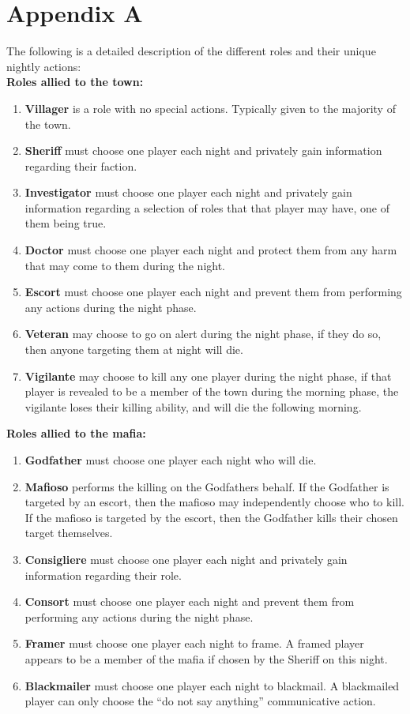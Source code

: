 \section{Appendix A}\label{app:A}
The following is a detailed description of the different roles and their unique nightly actions: \\
\textbf{Roles allied to the town:} 
\begin{enumerate}
	\item\textbf{Villager} is a  role with no special actions. Typically given to the majority of the town. 
	\item\textbf{Sheriff} must choose one player each night and privately gain information regarding their faction. 
	\item\textbf{Investigator} must choose one player each night and privately gain information regarding a selection of roles that that player may have, one of them being true.
	\item\textbf{Doctor} must choose one player each night and protect them from any harm that may come to them during the night. 
	\item\textbf{Escort} must choose one player each night and prevent them from performing any actions during the night phase.
	\item\textbf{Veteran} may choose to go on alert during the night phase, if they do so, then anyone targeting them at night will die. 
	\item\textbf{Vigilante} may choose to kill any one player during the night phase, if that player is revealed to be a member of the town during the morning phase, the vigilante loses their killing ability, and will die the following morning.
\end{enumerate}
\textbf{Roles allied to the mafia:} 
\begin{enumerate}
	\item\textbf{Godfather} must choose one player each night who will die. 
	\item\textbf{Mafioso} performs the killing on the Godfathers behalf. If the Godfather is targeted by an escort, then the mafioso may independently choose who to kill. If the mafioso is targeted by the escort, then the Godfather kills their chosen target themselves.
	\item\textbf{Consigliere} must choose one player each night and privately gain information regarding their role. 
	\item\textbf{Consort} must choose one player each night and prevent them from performing any actions during the night phase.
	\item\textbf{Framer} must choose one player each night to frame. A framed player appears to be a member of the mafia if chosen by the Sheriff on this night.
	\item\textbf{Blackmailer} must choose one player each night to blackmail. A blackmailed player can only choose the “do not say anything” communicative action. 
\end{enumerate}